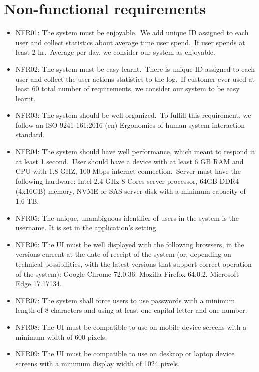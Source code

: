 \section{Non-functional requirements}\label{sec:non-functional-requirements}
\begin{itemize}
    \item NFR01: The system must be enjoyable.\ We add unique ID assigned to each user and
    collect statistics about average time user spend.\ If user spends at least 2 hr.\ Average
    per day, we consider our system as enjoyable.
    \item NFR02: The system must be easy learnt.\ There is unique ID assigned to each user and
    collect the user actions statistics to the log.\ If customer ever used at least 60%
    total number of requirements, we consider our system to be easy learnt.
    \item NFR03: The system should be well organized.\ To fulfill this requirement, we follow an
    ISO 9241-161:2016 (en) Ergonomics of human-system interaction standard.
    \item NFR04: The system should have well performance, which meant to respond it at
    least 1 second.\ User should have a device with at least 6 GB RAM and CPU with 1.8
    GHZ, 100 Mbps internet connection.\ Server must have the following hardware: Intel
    2.4 GHz 8 Cores server processor, 64GB DDR4 (4x16GB) memory, NVME or SAS
    server disk with a minimum capacity of 1.6 TB.
    \item NFR05: The unique, unambiguous identifier of users in the system is the username. It
    is set in the application’s setting.
    \item NFR06: The UI must be well displayed with the following browsers, in the versions
    current at the date of receipt of the system (or, depending on technical possibilities,
    with the latest versions that support correct operation of the system):
    Google Chrome 72.0.36.
    Mozilla Firefox 64.0.2.
    Microsoft Edge 17.17134.
    \item NFR07: The system shall force users to use passwords with a minimum length of 8
    characters and using at least one capital letter and one number.
    \item NFR08: The UI must be compatible to use on mobile device screens with a minimum
    width of 600 pixels.
    \item NFR09: The UI must be compatible to use on desktop or laptop device screens with a
    minimum display width of 1024 pixels.
\end{itemize}
